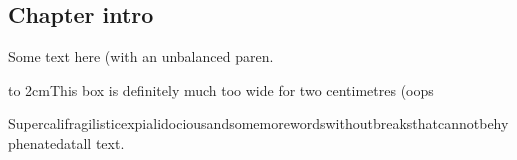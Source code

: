 \subsection{Chapter intro}
Some text \undefinedmacro{} here (with an unbalanced paren.

\noindent\hbox to 2cm{This box is definitely much too wide for two centimetres (oops}

Supercalifragilisticexpialidociousandsomemorewordswithoutbreaksthatcannotbehyphenatedatall text.

